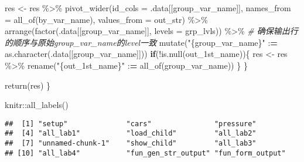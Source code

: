 \documentclass[
]{ctexart}
\newenvironment{Shaded}{\begin{snugshade}}{\end{snugshade}}
\newcommand{\AttributeTok}[1]{\textcolor[rgb]{0.77,0.63,0.00}{#1}}
\newcommand{\CommentTok}[1]{\textcolor[rgb]{0.56,0.35,0.01}{\textit{#1}}}
\newcommand{\ControlFlowTok}[1]{\textcolor[rgb]{0.13,0.29,0.53}{\textbf{#1}}}
\newcommand{\ErrorTok}[1]{\textcolor[rgb]{0.64,0.00,0.00}{\textbf{#1}}}
\newcommand{\FunctionTok}[1]{\textcolor[rgb]{0.00,0.00,0.00}{#1}}
\newcommand{\NormalTok}[1]{#1}
\newcommand{\OtherTok}[1]{\textcolor[rgb]{0.56,0.35,0.01}{#1}}
\newcommand{\SpecialCharTok}[1]{\textcolor[rgb]{0.00,0.00,0.00}{#1}}
\newcommand{\StringTok}[1]{\textcolor[rgb]{0.31,0.60,0.02}{#1}}
\begin{document}
\begin{Shaded}
\begin{Highlighting}[]
\NormalTok{        res }\OtherTok{\textless{}{-}}\NormalTok{ res }\SpecialCharTok{\%\textgreater{}\%}
            \FunctionTok{pivot\_wider}\NormalTok{(}\AttributeTok{id\_cols =}\NormalTok{ .data[[group\_var\_name]], }
                        \AttributeTok{names\_from =} \FunctionTok{all\_of}\NormalTok{(by\_var\_name), }
                        \AttributeTok{values\_from =}\NormalTok{ out\_str) }\SpecialCharTok{\%\textgreater{}\%}
            \FunctionTok{arrange}\NormalTok{(}\FunctionTok{factor}\NormalTok{(.data[[group\_var\_name]], }\AttributeTok{levels =}\NormalTok{ grp\_lvls)) }\SpecialCharTok{\%\textgreater{}\%}    \CommentTok{\# 确保输出行的顺序与原始\textasciigrave{}group\_var\_name\textasciigrave{}的level一致}
            \FunctionTok{mutate}\NormalTok{(}\StringTok{"\{group\_var\_name\}"} \SpecialCharTok{:}\ErrorTok{=} \FunctionTok{as.character}\NormalTok{(.data[[group\_var\_name]]))}
        \ControlFlowTok{if}\NormalTok{(}\SpecialCharTok{!}\FunctionTok{is.null}\NormalTok{(out\_1st\_name))\{}
\NormalTok{            res }\OtherTok{\textless{}{-}}\NormalTok{ res }\SpecialCharTok{\%\textgreater{}\%}
                \FunctionTok{rename}\NormalTok{(}\StringTok{"\{out\_1st\_name\}"} \SpecialCharTok{:}\ErrorTok{=} \FunctionTok{all\_of}\NormalTok{(group\_var\_name))}
\NormalTok{        \}}
\NormalTok{    \}}
    
    \FunctionTok{return}\NormalTok{(res)}
\NormalTok{\}}
\end{Highlighting}
\end{Shaded}

\begin{Shaded}
\begin{Highlighting}[]
\NormalTok{knitr}\SpecialCharTok{::}\FunctionTok{all\_labels}\NormalTok{()}
\end{Highlighting}
\end{Shaded}

\begin{verbatim}
##  [1] "setup"              "cars"               "pressure"          
##  [4] "all_lab1"           "load_child"         "all_lab2"          
##  [7] "unnamed-chunk-1"    "show_child"         "all_lab3"          
## [10] "all_lab4"           "fun_gen_str_output" "fun_form_output"
\end{verbatim}
\end{document}
